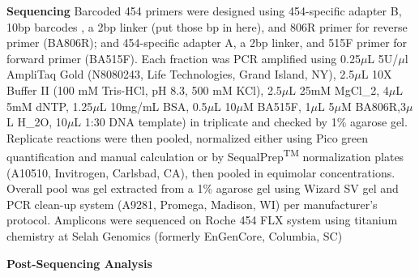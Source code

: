 \textbf{Sequencing}  Barcoded 454 primers were designed using 454-specific adapter B, 10bp barcodes \cite{Hamady_2008}, a 2bp linker (put those bp in here), and 806R primer for reverse primer (BA806R); and 454-specific adapter A, a 2bp linker, and 515F primer for forward primer (BA515F). Each fraction was PCR amplified using 0.25$\mu$L 5U/$\mu$l AmpliTaq Gold (N8080243, Life Technologies, Grand Island, NY), 2.5$\mu$L 10X Buffer II (100 mM Tris-HCl, pH 8.3, 500 mM KCl), 2.5$\mu$L 25mM MgCl_{2}, 4$\mu$L 5mM dNTP, 1.25$\mu$L 10mg/mL BSA, 0.5$\mu$L 10$\mu$M BA515F, 1$\mu$L 5$\mu$M BA806R,3$\mu$L H_{2}O, 10$\mu$L 1:30 DNA template) in triplicate and checked by 1\% agarose gel. Replicate reactions were then pooled, normalized either using Pico green quantification and manual calculation or by SequalPrep\textsuperscript{TM} normalization plates (A10510, Invitrogen, Carlsbad, CA), then pooled in equimolar concentrations.  Overall pool was gel extracted from a 1\% agarose gel using Wizard SV gel and PCR clean-up system (A9281, Promega, Madison, WI) per manufacturer's protocol.  Amplicons were sequenced on Roche 454 FLX system using titanium chemistry at Selah Genomics (formerly EnGenCore, Columbia, SC)    

\textbf{Post-Sequencing Analysis}
 